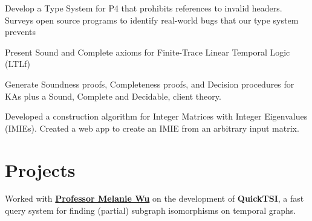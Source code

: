 \documentclass[]{deedy-resume-openfont}
\begin{document}
\begin{minipage}[t]{0.66\textwidth}




Develop a Type System for P4 that prohibits references to invalid headers. Surveys open source programs to identify real-world bugs that our type system prevents
\sectionsep







Present Sound and Complete axioms for Finite-Trace Linear Temporal Logic (LTLf)
\sectionsep







Generate Soundness proofs, Completeness proofs, and Decision procedures for KAs plus a Sound, Complete and Decidable, client theory.
\sectionsep










Developed a construction algorithm for Integer Matrices with Integer Eigenvalues (IMIEs). Created a web app to create an IMIE from an arbitrary input matrix.
\sectionsep





\section{Projects}

Worked with \textbf{\href{http://www.cs.pomona.edu/~mwu/files/bio.htm}{Professor Melanie Wu}} on the development of \textbf{QuickTSI}, a fast query system for finding (partial) subgraph isomorphisms on temporal graphs.
\sectionsep


\end{minipage}
\end{document}
